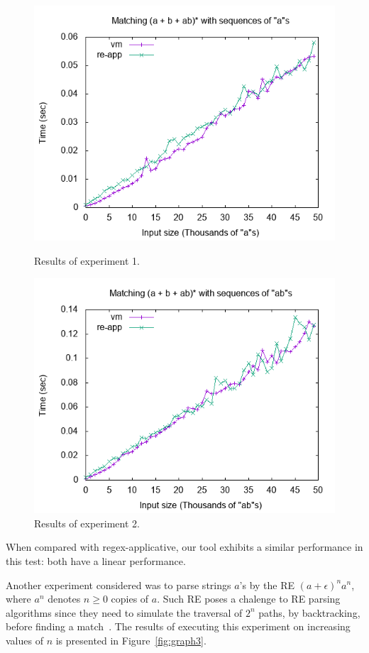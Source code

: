 \documentclass[review]{elsarticle}
\theoremstyle{definition}
\begin{document}
\begin{figure}[h]
  \centering
  \begin{minipage}{0.45\textwidth}
    \includegraphics[width=.9\textwidth]{as.png}
    \caption{Results of experiment 1.}
    \label{fig:graph1}
  \end{minipage} \hfill
  \begin{minipage}{0.45\textwidth}
    \includegraphics[width=.9\textwidth]{abs.png}
    \caption{Results of experiment 2.}
    \label{fig:graph2}
  \end{minipage}
\end{figure}

When compared with regex-applicative, our tool exhibits a similar performance in
this test: both have a linear performance.

Another experiment considered was to parse strings $a$'s by the RE $(a +
\epsilon)^na^n$, where $a^n$ denotes $n \geq 0$ copies of $a$. Such RE poses a 
chalenge to RE parsing algorithms since they need to simulate the traversal of
$2^n$ paths, by backtracking, before finding a match~\cite{Lasse2011}. The
results of executing this experiment on increasing values of $n$ is presented 
in Figure~\ref{fig:graph3}.
\end{document}
